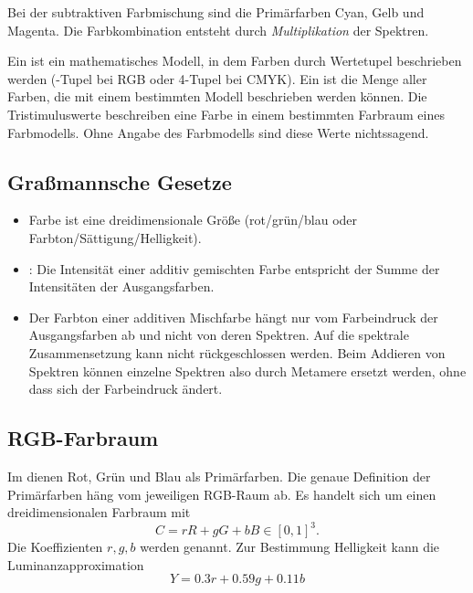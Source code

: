 Bei der subtraktiven Farbmischung sind die Primärfarben Cyan, Gelb und Magenta.
Die Farbkombination entsteht durch \emph{Multiplikation} der Spektren.

Ein  ist ein mathematisches Modell, in dem Farben durch Wertetupel beschrieben werden (-Tupel bei RGB oder 4-Tupel bei CMYK).
Ein  ist die Menge aller Farben, die mit einem bestimmten Modell beschrieben werden können.
Die Tristimuluswerte beschreiben eine Farbe in einem bestimmten Farbraum eines Farbmodells.
Ohne Angabe des Farbmodells sind diese Werte nichtssagend.

\subsection{Graßmannsche Gesetze}
\begin{itemize}
	\item Farbe ist eine dreidimensionale Größe (\zB rot/grün/blau oder Farbton/Sättigung/Helligkeit).
	\item {}:
	Die Intensität einer additiv gemischten Farbe entspricht der Summe der Intensitäten der Ausgangsfarben.
	\item Der Farbton einer additiven Mischfarbe hängt nur vom Farbeindruck der Ausgangsfarben ab und nicht von deren Spektren.
	Auf die spektrale Zusammensetzung kann nicht rückgeschlossen werden.
	Beim Addieren von Spektren können einzelne Spektren also durch Metamere ersetzt werden, ohne dass sich der Farbeindruck ändert.
\end{itemize}

\subsection{RGB-Farbraum}
Im  dienen Rot, Grün und Blau als Primärfarben.
Die genaue Definition der Primärfarben häng vom jeweiligen RGB-Raum ab.
Es handelt sich um einen dreidimensionalen Farbraum mit
\[
	C = rR + gG + bB \in [0,1]^3 \text{.}
\]
Die Koeffizienten $r,g,b$ werden  genannt.
Zur Bestimmung Helligkeit kann die Luminanzapproximation
\[
	Y = 0.3r + 0.59g + 0.11b
\]

